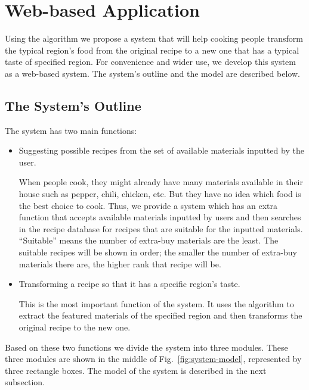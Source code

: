\chapter{Web-based Application}\label{chap:evaluation}

Using the algorithm we propose a system that will help cooking people transform the typical region's food from the original recipe to a new one that has a typical taste of specified region. For convenience and wider use, we develop this system as a web-based system. The system's outline and the model are described below.  

\section{The System's Outline} 

The system has two main functions:

\begin{itemize}

\item Suggesting possible recipes from the set of available materials inputted by the user. 

When people cook, they might already have many materials available in their house such as pepper, chili, chicken, etc. But they have no idea which food is the best choice to cook. Thus, we provide a system which has an extra function that accepts available materials inputted by users and then searches in the recipe database for recipes that are suitable for the inputted materials. ``Suitable'' means the number of extra-buy materials are the least. The suitable recipes will be shown in order; the smaller the number of extra-buy materials there are, the higher rank that recipe will be.

\item Transforming a recipe so that it has a specific region's taste. 

This is the most important function of the system. It uses the algorithm to extract the featured materials of the specified region and then transforms the original recipe to the new one. 
\end{itemize}

Based on these two functions we divide the system into three modules. These three modules are shown in the middle of Fig.~\ref{fig:system-model}, represented by three rectangle boxes. The model of the system is described in the next subsection.
 
